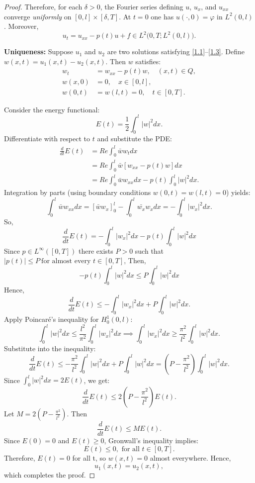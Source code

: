 \documentclass[10pt,a4paper]{amsart}
\begin{document}
\begin{proof}
Therefore, for each $\delta>0$, the Fourier series defining $u$, $u_x$, and $u_{xx}$
converge \emph{uniformly} on $[0,l]\times[\delta,T]$.
At $t=0$ one has $u(\cdot,0)=\varphi$ in $L^2(0,l)$.
Moreover,
\[
u_t=u_{xx}-p(t)u+f\in L^2\!\big(0,T;L^2(0,l)\big).
\]


\textbf{Uniqueness:} 
Suppose $u_1$ and $u_2$ are two solutions satisfying \eqref{1.1}--\eqref{1.3}. Define $w(x,t) = u_1(x,t) - u_2(x,t)$. Then $w$ satisfies:
\begin{align*}
    w_t &= w_{xx} - p(t) w, \quad (x,t) \in Q, \\
    w(x,0) &= 0, \quad x \in [0,l], \\
    w(0,t) &= w(l,t) = 0, \quad t \in [0,T].
\end{align*}

Consider the energy functional:
\[
E(t) = \frac{1}{2} \int_0^l |w|^2  dx.
\]
Differentiate with respect to $t$ and substitute the PDE:
\begin{align*}
\frac{d}{dt}E(t) &= Re\int_0^l \bar{w}w_t dx \\
&= Re\int_0^l \bar{w} [w_{xx} - p(t) w]  dx \\
&= Re\int_0^l \bar{w} w_{xx}  dx - p(t) \int_0^l |w|^2  dx.
\end{align*}
Integration by parts (using boundary conditions $w(0,t) = w(l,t) = 0$) yields:
\[
\int_0^l \bar{w} w_{xx}  dx = \left[ \bar{w} w_x \right]_0^l - \int_0^l \bar{w_x} w_x   dx = - \int_0^l |w_x|^2 dx.
\]
So,
\[
\frac{d}{dt}E(t) = - \int_0^l |w_x|^2 dx - p(t) \int_0^l |w|^2 dx
\]
Since $p \in L^{\infty}([0,T])$ there exists $P>0$ such that $|p(t)| \leq P\ \text{for almost every  $t \in [0,T]$,}$ Then,
\[
- p(t) \int_0^l |w|^2 dx \leq P \int_0^l |w|^2 dx
\]
Hence,
\[
\frac{d}{dt}E(t) \leq - \int_0^l |w_x|^2 dx + P \int_0^l |w|^2 dx.
\]
Apply Poincaré's inequality for $H_0^1(0,l)$:
\[
\int_0^l |w|^2 dx  \leq \frac{l^2}{\pi^2} \int_0^l | w_x |^2 dx \implies \int_0^l | w_x |^2 dx \geq \frac{\pi^2}{l^2} \int_0^l|w|^2 dx.
\]
Substitute into the inequality:
\[
\frac{d}{dt}E(t) \leq - \frac{\pi^2}{l^2}\int_0^l |w|^2 dx + P \int_0^l |w|^2 dx = (P-\frac{\pi^2}{l^2})\int_0^l |w|^2 dx.
\]
Since $\int_0^l |w|^2 dx = 2E(t)$, we get:
\[
\frac{d}{dt}E(t) \leq 2(P-\frac{\pi^2}{l^2})E(t).
\]
Let $M=2(P-\frac{\pi^2}{l^2})$. Then
\[
\frac{d}{dt}E(t) \leq ME(t).
\]
Since $ E(0) = 0$ and $E(t) \geq 0$, Gronwall’s inequality implies:
\[
E(t) \leq 0, \text{ for all }  t \in [0,T].
\]
Therefore, $E(t)=0$ for all t, so $w(x,t)=0$ almost everywhere. Hence, 
\[
u_1(x,t) = u_2(x,t),
\]
which completes the proof.
\end{proof}
\end{document}
